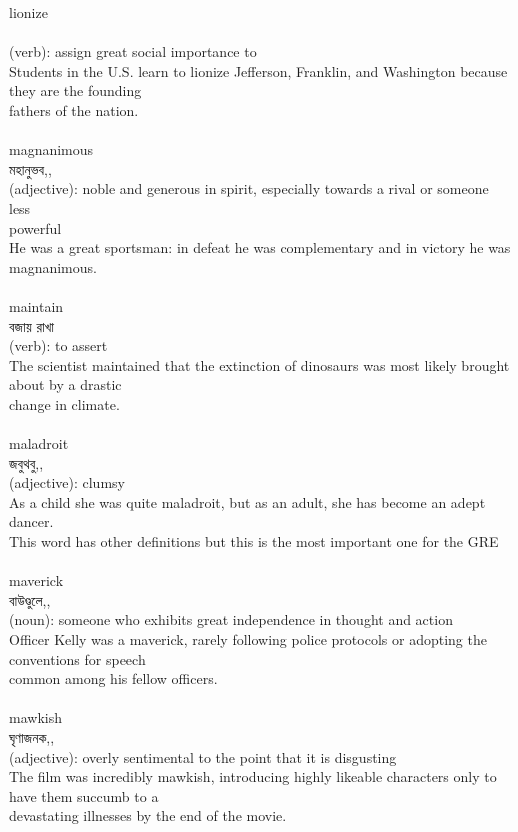 \documentclass{article}
\begin{document}
{lionize}\\
{}\\
{(verb): assign great social importance to\\Students in the U.S. learn to lionize Jefferson, Franklin, and Washington because they are the founding\\fathers of the nation.\\}\\
{magnanimous}\\
{মহানুভব,,}\\
{(adjective): noble and generous in spirit, especially towards a rival or someone less\\powerful\\He was a great sportsman: in defeat he was complementary and in victory he was magnanimous.\\}\\
{maintain}\\
{বজায় রাখা}\\
{(verb): to assert\\The scientist maintained that the extinction of dinosaurs was most likely brought about by a drastic\\change in climate.\\}\\
{maladroit}\\
{জবুথবু,,}\\
{(adjective): clumsy\\As a child she was quite maladroit, but as an adult, she has become an adept dancer.\\This word has other definitions but this is the most important one for the GRE\\}\\
{maverick}\\
{বাউণ্ডুলে,,}\\
{(noun): someone who exhibits great independence in thought and action\\Officer Kelly was a maverick, rarely following police protocols or adopting the conventions for speech\\common among his fellow officers.\\}\\
{mawkish}\\
{ঘৃণাজনক,,}\\
{(adjective): overly sentimental to the point that it is disgusting\\The film was incredibly mawkish, introducing highly likeable characters only to have them succumb to a\\devastating illnesses by the end of the movie.\\}\\
\end{document}
